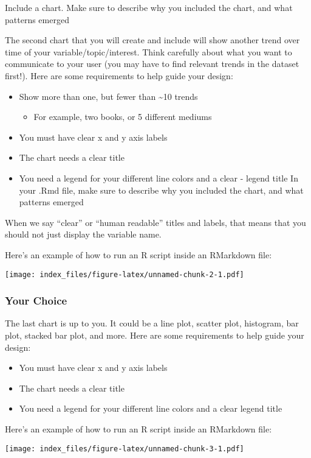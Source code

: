 \documentclass[
]{article}
\providecommand{\tightlist}{%
  \setlength{\itemsep}{0pt}\setlength{\parskip}{0pt}}
\begin{document}
Include a chart. Make sure to describe why you included the chart, and
what patterns emerged

The second chart that you will create and include will show another
trend over time of your variable/topic/interest. Think carefully about
what you want to communicate to your user (you may have to find relevant
trends in the dataset first!). Here are some requirements to help guide
your design:

\begin{itemize}
\tightlist
\item
  Show more than one, but fewer than \textasciitilde10 trends

  \begin{itemize}
  \tightlist
  \item
    For example, two books, or 5 different mediums
  \end{itemize}
\item
  You must have clear x and y axis labels
\item
  The chart needs a clear title~
\item
  You need a legend for your different line colors and a clear - legend
  title In your .Rmd file, make sure to describe why you included the
  chart, and what patterns emerged
\end{itemize}

When we say ``clear'' or ``human readable'' titles and labels, that
means that you should not just display the variable name.

Here's an example of how to run an R script inside an RMarkdown file:

\texttt{[image: index\_files/figure-latex/unnamed-chunk-2-1.pdf]}

\hypertarget{your-choice}{%
\subsubsection{Your Choice}\label{your-choice}}

The last chart is up to you. It could be a line plot, scatter plot,
histogram, bar plot, stacked bar plot, and more. Here are some
requirements to help guide your design:

\begin{itemize}
\tightlist
\item
  You must have clear x and y axis labels
\item
  The chart needs a clear title~
\item
  You need a legend for your different line colors and a clear legend
  title
\end{itemize}

Here's an example of how to run an R script inside an RMarkdown file:

\texttt{[image: index\_files/figure-latex/unnamed-chunk-3-1.pdf]}
\end{document}
